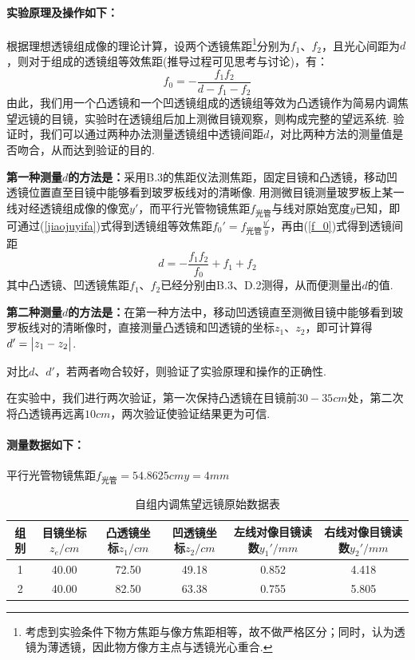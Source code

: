 \documentclass[UTF8]{ctexart}
\begin{document}
\paragraph{实验原理及操作如下：}\quad\par
根据理想透镜组成像的理论计算，设两个透镜焦距\footnote{考虑到实验条件下物方焦距与像方焦距相等，故不做严格区分；同时，认为透镜为薄透镜，因此物方像方主点与透镜光心重合.}分别为$f_1$、$f_2$，且光心间距为$d$，则对于组成的透镜组等效焦距(推导过程可见思考与讨论)，有：
\begin{equation}
    \label{f_0}
    f_0=-\frac{f_1f_2}{d-f_1-f_2}
\end{equation}
由此，我们用一个凸透镜和一个凹透镜组成的透镜组等效为凸透镜作为简易内调焦望远镜的目镜，实验时在透镜组后加上测微目镜观察，则构成完整的望远系统. 验证时，我们可以通过两种办法测量透镜组中透镜间距$d$，对比两种方法的测量值是否吻合，从而达到验证的目的.\par
\textbf{第一种测量$d$的方法是：}采用B.3的焦距仪法测焦距，固定目镜和凸透镜，移动凹透镜位置直至目镜中能够看到玻罗板线对的清晰像. 用测微目镜测量玻罗板上某一线对经透镜组成像的像宽$y'$，而平行光管物镜焦距$f_{\text{光管}}$与线对原始宽度$y$已知，即可通过(\ref{jiaojuyifa})式得到透镜组等效焦距$\displaystyle{f_0'=f_{\text{光管}}\frac{y'}{y}}$，再由(\ref{f_0})式得到透镜间距
\begin{equation}
    d=\displaystyle{-\frac{f_1f_2}{f_0}+f_1+f_2}
\end{equation}
    其中凸透镜、凹透镜焦距$f_1$、$f_2$已经分别由B.3、D.2测得，从而便测量出$d$的值.\par
\textbf{第二种测量$d$的方法是：}在第一种方法中，移动凹透镜直至测微目镜中能够看到玻罗板线对的清晰像时，直接测量凸透镜和凹透镜的坐标$z_1$、$z_2$，即可计算得$d'=\big{|}z_1-z_2\big{|}$.\par
对比$d$、$d'$，若两者吻合较好，则验证了实验原理和操作的正确性.\par
在实验中，我们进行两次验证，第一次保持凸透镜在目镜前$30-35cm$处，第二次将凸透镜再远离$10cm$，两次验证使验证结果更为可信.
\paragraph{测量数据如下：}\quad\par
\begin{table}[H]\begin{center}
    平行光管物镜焦距$f_{\text{光管}}=54.8625cm$$y=4mm$
    \caption{自组内调焦望远镜原始数据表}
    
\resizebox{\textwidth}{!}
{
    \begin{tabular}{|c|c|c|c|c|c|}
        \hline
        组别&目镜坐标$z_e/cm$&凸透镜坐标$z_1/cm$&凹透镜坐标$z_2/cm$&左线对像目镜读数$y_1'/mm$&右线对像目镜读数$y_2'/mm$\\
        \hline
        1&40.00&72.50&49.18&0.852&4.418\\
        \hline
        2&40.00&82.50&63.38&0.755&5.805\\
        \hline
    \end{tabular}
}
\end{center}\end{table}
\end{document}
